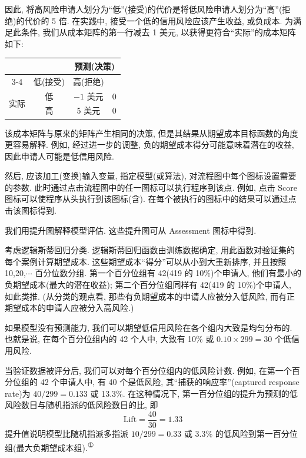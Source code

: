 
因此, 将高风险申请人划分为“低”(接受)的代价是将低风险申请人划分为“高”(拒绝)的代价的 5 倍. 在实践中, 接受一个低的信用风险应该产生收益, 或负成本. 为满足此条件, 我们从成本矩阵的第一行减去 1 美元, 以获得更符合“实际”的成本矩阵如下:

\begin{mvtable}
\setlength{\tabcolsep}{14pt}%
\begin{tabular}{cc|cc}
\toprule
\multicolumn{2}{c|}{} & \multicolumn{2}{c}{预测(决策)} \\
\cmidrule(lr){3-4}
\multicolumn{2}{c|}{} & 低(接受) & 高(拒绝) \\
\midrule
\multirow{2}{*}{实际} & 低 & $-1$ 美元 & 0 \\
& 高 & 5 美元 & 0 \\
\bottomrule
\end{tabular}
\end{mvtable}

该成本矩阵与原来的矩阵产生相同的决策, 但是其结果从期望成本目标函数的角度更容易解释. 例如, 经过进一步的调整, 负的期望成本得分可能意味着潜在的收益, 因此申请人可能是低信用风险.

然后, 应该加工(变换)输入变量, 指定模型(或算法), 对流程图中每个图标设置需要的参数. 此时通过点击流程图中的任一图标可以执行程序到该点. 例如, 点击 Score 图标可以使程序从头执行到该图标(含). 在每个被执行的图标中的结果可以通过点击该图标得到.

我们用提升图解释模型评估. 这些提升图可从 Assessment 图标中得到.

考虑逻辑斯蒂回归分类. 逻辑斯蒂回归函数由训练数据确定, 用此函数对验证集的每个案例计算期望成本. 这些期望成本“得分”可以从小到大重新排序, 并且按照 10,20,$\cdots$ 百分位数分组. 第一个百分位组有 42(419 的 10\%)个申请人, 他们有最小的负期望成本(最大的潜在收益); 第二个百分位组同样有 42(419 的 10\%)个申请人, 如此类推. (从分类的观点看, 那些有负期望成本的申请人应被分入低风险, 而有正期望成本的申请人应被分入高风险.)

如果模型没有预测能力, 我们可以期望低信用风险在各个组内大致是均匀分布的. 也就是说, 在每个百分位组内的 42 个人中, 大致有 10\% 或 $0.10\times299=30$ 个低信用风险.

当验证数据被评分后, 我们可以对每个百分位组内的低风险计数. 例如, 在第一个百分位组的 42 个申请人中, 有 40 个是低风险, 其“捕获的响应率”(captured response rate)为 $40/299=0.133$ 或 13.3\%. 在这种情况下, 第一百分位组的提升为预测的低风险数目与随机指派的低风险数目的比, 即
\[
\mathrm{Lift}=\frac{40}{30}=1.33
\]
提升值说明模型比随机指派多指派 $10/299=0.33$ 或 3.3\% 的低风险到第一百分位组(最大负期望成本组).\textsuperscript{①}

